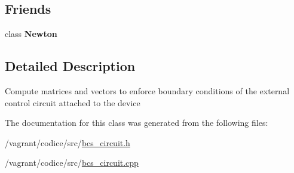 \subsection*{Friends}
\begin{DoxyCompactItemize}
\item 
\hypertarget{classBCS__CIRC_ad2735e83fbe6fced5d99a8b125c9c8d7}{class {\bfseries Newton}}\label{classBCS__CIRC_ad2735e83fbe6fced5d99a8b125c9c8d7}

\end{DoxyCompactItemize}


\subsection{Detailed Description}
Compute matrices and vectors to enforce boundary conditions of the external control circuit attached to the device 

The documentation for this class was generated from the following files\-:\begin{DoxyCompactItemize}
\item 
/vagrant/codice/src/\hyperlink{bcs__circuit_8h}{bcs\-\_\-circuit.\-h}\item 
/vagrant/codice/src/\hyperlink{bcs__circuit_8cpp}{bcs\-\_\-circuit.\-cpp}\end{DoxyCompactItemize}
